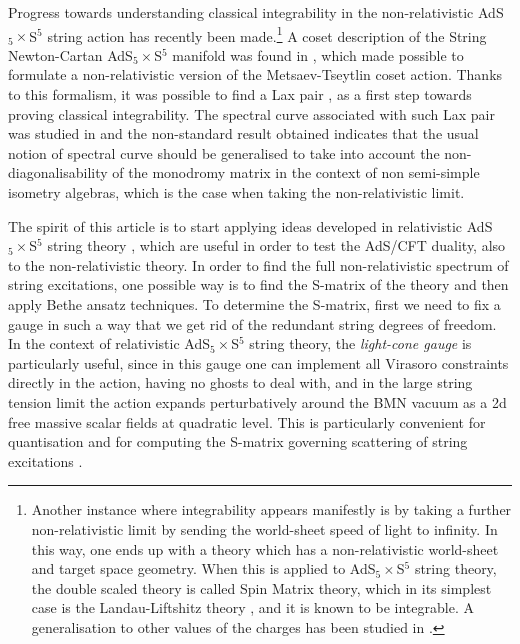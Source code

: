 \documentclass[12pt]{article}
\numberwithin{equation}{section}
\begin{document}
Progress towards understanding classical integrability in the non-relativistic AdS$_5\times$S$^5$ string action has recently been made.\footnote{Another instance where integrability appears manifestly is by taking a further non-relativistic limit by sending the world-sheet speed of light to infinity. In this way, one ends up with a theory which has a non-relativistic world-sheet and target space geometry. When this is applied to AdS$_5\times$S$^5$ string theory, the double scaled theory is called  Spin Matrix theory, which in its simplest case is the Landau-Liftshitz theory \cite{Harmark:2017rpg, Harmark:2018cdl, Harmark:2019upf}, and it is known to be integrable.  A generalisation to other values of the charges has been studied in \cite{Harmark:2020vll}.} A coset description of the String Newton-Cartan AdS$_5 \times$S$^5$ manifold was found in \cite{Fontanella:2022fjd, Fontanella:2022pbm}, which made possible to formulate a non-relativistic version of the Metsaev-Tseytlin coset action. Thanks to this formalism, it was possible to find a Lax pair \cite{Fontanella:2022fjd}, as a first step towards proving classical integrability.   
The spectral curve associated with such Lax pair was studied in \cite{Fontanella:2022wfj} and the non-standard result obtained indicates that the usual notion of spectral curve should be generalised to take into account the non-diagonalisability of the monodromy matrix in the context of non semi-simple isometry algebras, which is the case when taking the non-relativistic limit.
 

The spirit of this article is to start applying ideas developed in relativistic AdS$_5\times$S$^5$ string theory \cite{Arutyunov:2009ga, Arutyunov:2005hd,Frolov:2006cc}, which are useful in order to test the AdS/CFT duality,  also to the non-relativistic theory.  In order to find the full non-relativistic spectrum of string excitations, one possible way is to find the S-matrix of the theory and then apply Bethe ansatz techniques. To determine the S-matrix, first we need to fix a gauge in such a way that we get rid of the redundant string degrees of freedom.  In the context of relativistic AdS$_5\times$S$^5$ string theory, the \emph{light-cone gauge} is particularly useful, since in this gauge one can implement all Virasoro constraints directly in the action, having no ghosts to deal with, and in the large string tension limit the action expands perturbatively around the BMN vacuum as a 2d free massive scalar fields at quadratic level. This is particularly convenient for quantisation and for computing the S-matrix governing scattering of string excitations \cite{Beisert:2010jr,Arutyunov:2009ga, Arutyunov:2005hd,Frolov:2006cc}. 
\end{document}
